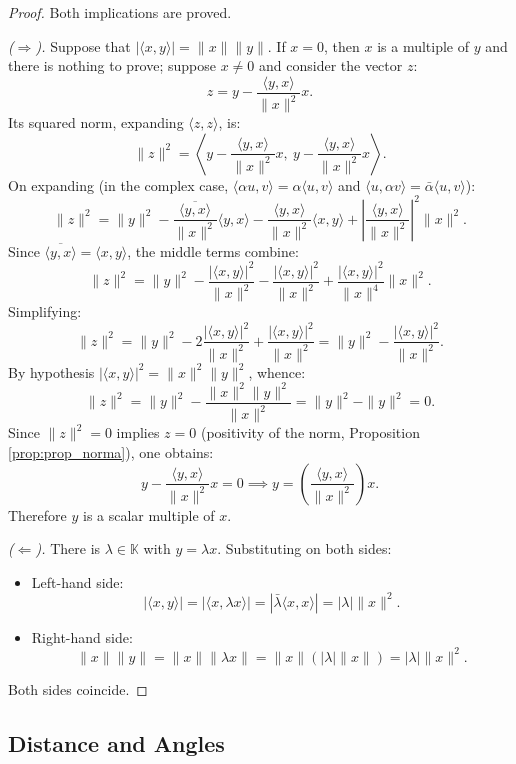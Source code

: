 \documentclass[11pt, a4paper]{article}
\begin{document}
\begin{proof}
Both implications are proved.

\textit{($\Rightarrow$).} Suppose that $|\langle x, y \rangle| = \|x\| \|y\|$. If $x = 0$, then
$x$ is a multiple of $y$ and there is nothing to prove; suppose $x \neq 0$ and consider the vector $z$:
\[
z = y - \frac{\langle y, x \rangle}{\|x\|^2} x.
\]
Its squared norm, expanding $\langle z, z \rangle$, is:
\[
\|z\|^2 = \left\langle y - \frac{\langle y, x \rangle}{\|x\|^2} x, \ y - \frac{\langle y, x \rangle}{\|x\|^2} x \right\rangle.
\]
On expanding (in the complex case, $\langle \alpha u, v \rangle = \alpha \langle u, v \rangle$ and $\langle u, \alpha v \rangle = \bar{\alpha} \langle u, v \rangle$):
\[
\|z\|^2 = \|y\|^2 - \frac{\overline{\langle y, x \rangle}}{\|x\|^2}\langle y, x \rangle - \frac{\langle y, x \rangle}{\|x\|^2}\langle x, y \rangle + \left| \frac{\langle y, x \rangle}{\|x\|^2} \right|^2 \|x\|^2.
\]
Since $\overline{\langle y, x \rangle} = \langle x, y \rangle$, the middle terms combine:
\[
\|z\|^2 = \|y\|^2 - \frac{|\langle x, y \rangle|^2}{\|x\|^2} - \frac{|\langle x, y \rangle|^2}{\|x\|^2} + \frac{|\langle x, y \rangle|^2}{\|x\|^4} \|x\|^2.
\]
Simplifying:
\[
\|z\|^2 = \|y\|^2 - 2\frac{|\langle x, y \rangle|^2}{\|x\|^2} + \frac{|\langle x, y \rangle|^2}{\|x\|^2} = \|y\|^2 - \frac{|\langle x, y \rangle|^2}{\|x\|^2}.
\]
By hypothesis $|\langle x, y \rangle|^2 = \|x\|^2 \|y\|^2$, whence:
\[
\|z\|^2 = \|y\|^2 - \frac{\|x\|^2 \|y\|^2}{\|x\|^2} = \|y\|^2 - \|y\|^2 = 0.
\]
Since $\|z\|^2 = 0$ implies $z = 0$ (positivity of the norm, Proposition \ref{prop:prop_norma}), one obtains:
\[
y - \frac{\langle y, x \rangle}{\|x\|^2} x = 0 \implies y = \left( \frac{\langle y, x \rangle}{\|x\|^2} \right) x.
\]
Therefore $y$ is a scalar multiple of $x$.

\textit{($\Leftarrow$).} There is $\lambda \in \mathbb{K}$ with $y = \lambda x$. Substituting on both sides:
\begin{itemize}
    \item Left-hand side:
    \[
    |\langle x, y \rangle| = |\langle x, \lambda x \rangle| = |\bar{\lambda} \langle x, x \rangle| = |\lambda| \|x\|^2.
    \]
    \item Right-hand side:
    \[
    \|x\| \|y\| = \|x\| \|\lambda x\| = \|x\| (|\lambda| \|x\|) = |\lambda| \|x\|^2.
    \]
\end{itemize}
Both sides coincide.
\end{proof}

\subsection{Distance and Angles}
\end{document}

